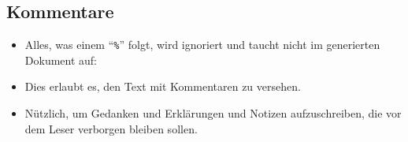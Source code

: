 \subsection{Kommentare}

\begin{frame}{\subsecname}
    \begin{itemize}
        \item Alles, was einem \enquote{\texttt{\%}} folgt, wird ignoriert und taucht nicht im
            generierten Dokument auf:
        \item Dies erlaubt es, den Text mit \alert{Kommentaren} zu versehen.
        \item Nützlich, um Gedanken und Erklärungen und Notizen aufzuschreiben, die vor dem Leser
            verborgen bleiben sollen.
    \end{itemize}
\end{frame}
